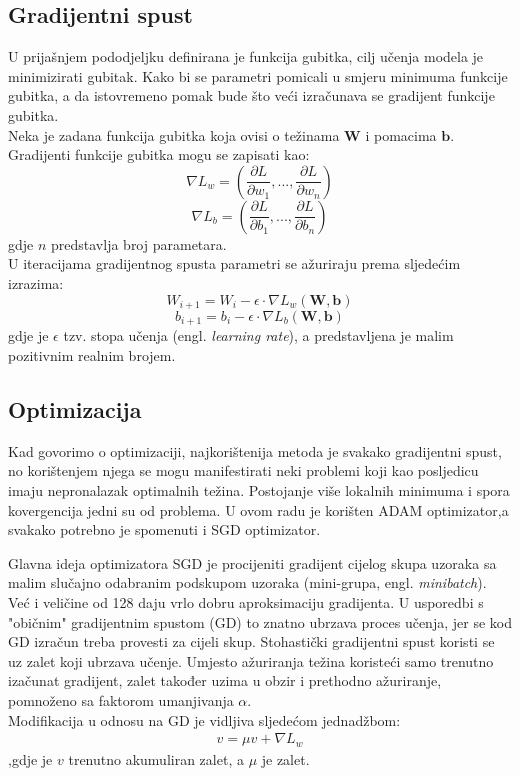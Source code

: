 \documentclass[times, utf8, zavrsni, numeric]{fer}
\begin{document}
\subsection{Gradijentni spust}
U prijašnjem pododjeljku definirana je funkcija gubitka, cilj učenja modela je minimizirati gubitak. Kako bi se parametri pomicali u smjeru minimuma funkcije gubitka, a da istovremeno pomak bude što veći izračunava se gradijent funkcije gubitka. \\
Neka je zadana funkcija gubitka koja ovisi o težinama $\textbf{W}$ i pomacima $\textbf{b}$. Gradijenti funkcije gubitka mogu se zapisati kao:
\begin{equation}
\nabla L_{w} = \left(\frac{\partial L}{\partial w_{1}},...,\frac{\partial L}{\partial w_{n}} \right)
\label{eq:Aktivacija}
\end{equation}
\begin{equation}
\nabla L_{b} = \left(\frac{\partial L}{\partial b_{1}},...,\frac{\partial L}{\partial b_{n}} \right)
\label{eq:Aktivacija}
\end{equation}
gdje $n$ predstavlja broj parametara.\\
U iteracijama gradijentnog spusta parametri se ažuriraju prema sljedećim izrazima:
\begin{equation}
W_{i+1} = W_{i} - \epsilon \cdot \nabla L_{w}(\textbf{W},\textbf{b})
\label{eq:Aktivacija}
\end{equation}
\begin{equation}
b_{i+1} = b_{i} - \epsilon \cdot \nabla L_{b}(\textbf{W},\textbf{b})
\label{eq:Aktivacija}
\end{equation}
gdje je $\epsilon$ tzv. stopa učenja (engl. \textit{learning rate}), a predstavljena je malim pozitivnim realnim brojem.\cite{duboko} \pagebreak
\subsection{Optimizacija}
Kad govorimo o optimizaciji, najkorištenija metoda je svakako gradijentni spust, no korištenjem njega se mogu manifestirati neki problemi koji kao posljedicu imaju nepronalazak optimalnih težina. Postojanje više lokalnih minimuma i spora kovergencija jedni su od problema. 
U ovom radu je korišten ADAM optimizator,a svakako potrebno je spomenuti i SGD optimizator. 

Glavna ideja optimizatora SGD je procijeniti gradijent cijelog skupa uzoraka sa malim slučajno odabranim podskupom uzoraka (mini-grupa, engl. \textit{minibatch}). Već i veličine od 128 daju vrlo dobru aproksimaciju gradijenta. U usporedbi s "običnim" gradijentnim spustom (GD) to znatno ubrzava proces učenja, jer se kod GD izračun treba provesti za cijeli skup. Stohastički gradijentni spust koristi se uz zalet koji ubrzava učenje. Umjesto ažuriranja težina koristeći samo trenutno izačunat gradijent, zalet također uzima u obzir i prethodno ažuriranje, pomnoženo sa faktorom umanjivanja $\alpha$.\cite{sgd}\\ 
Modifikacija u odnosu na GD je vidljiva sljedećom jednadžbom:
\begin{align}
v = \mu v + \nabla L_{w}
\end{align}
,gdje je $v$ trenutno akumuliran zalet, a $\mu$ je zalet.
\end{document}
